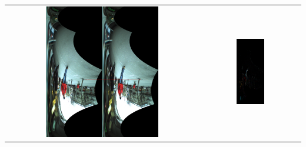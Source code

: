 \begin{framed}
\begin{center}
  \begin{tabular}{cc}
  \includegraphics[width=0.6\textwidth]{polarRectification}\label{fig:cp04_polarRectification} &
  \includegraphics[width=0.3\textwidth]{polarDiff}\label{fig:cp04_polarDiff}
  \end{tabular}
  \label{fig:cp04_polarRectification_example}
\end{center}

\end{framed}

